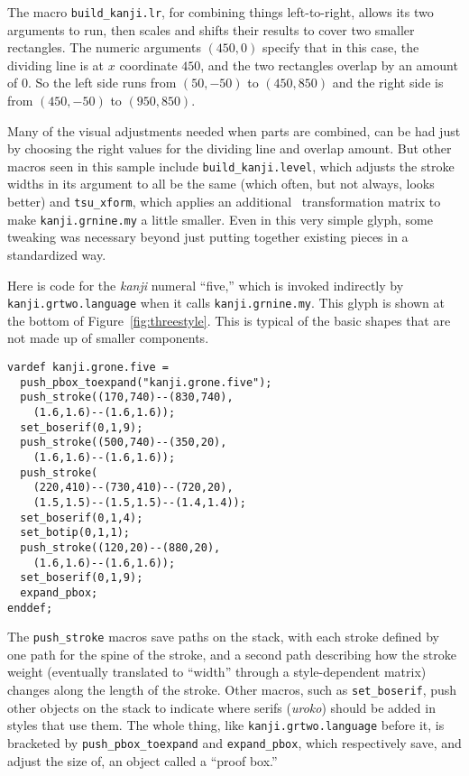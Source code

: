 \documentclass{ltugboat}
\begin{document}
The macro
\verb|build_kanji.lr|, for combining things left-to-right, allows its two
arguments to run, then scales and shifts their results to cover two smaller
rectangles.  The numeric arguments $(450,0)$ specify that in this case, the
dividing line is at $x$ coordinate $450$, and the two rectangles overlap by
an amount of $0$.  So the left side runs from $(50,-50)$ to $(450,850)$ and
the right side is from $(450,-50)$ to $(950,850)$.

Many of the visual adjustments needed when parts are combined, can be had
just by choosing the right values for the dividing line and overlap amount. 
But other macros seen in this sample include \verb|build_kanji.level|, which
adjusts the stroke widths in its argument to all be the same (which often,
but not always, looks better) and \verb|tsu_xform|, which applies an additional
\MF\ transformation matrix to make \verb|kanji.grnine.my| a little smaller.  Even
in this very simple glyph, some tweaking was necessary beyond just
putting together existing pieces in a standardized way.

Here is code for the \emph{kanji} numeral ``five,'' which is invoked indirectly by
\verb|kanji.grtwo.language| when it calls \verb|kanji.grnine.my|.  This
glyph is shown at the bottom of Figure~\ref{fig:threestyle}.  This is
typical of the basic shapes that are not made up of smaller components.
\begin{verbatim}
vardef kanji.grone.five =
  push_pbox_toexpand("kanji.grone.five");
  push_stroke((170,740)--(830,740),
    (1.6,1.6)--(1.6,1.6));
  set_boserif(0,1,9);
  push_stroke((500,740)--(350,20),
    (1.6,1.6)--(1.6,1.6));
  push_stroke(
    (220,410)--(730,410)--(720,20),
    (1.5,1.5)--(1.5,1.5)--(1.4,1.4));
  set_boserif(0,1,4);
  set_botip(0,1,1);
  push_stroke((120,20)--(880,20),
    (1.6,1.6)--(1.6,1.6));
  set_boserif(0,1,9);
  expand_pbox;
enddef;
\end{verbatim}

The \verb|push_stroke| macros save paths on the stack, with each stroke
defined by one path for the spine of the stroke, and a second path
describing how the stroke weight (eventually translated to ``width'' through
a style-dependent matrix) changes along the length of the stroke.  Other
macros, such as \verb|set_boserif|, push other objects on the stack to indicate
where serifs (\emph{uroko}) should be added in styles that use them.  The
whole thing, like \verb|kanji.grtwo.language| before it, is bracketed by
\verb|push_pbox_toexpand| and \verb|expand_pbox|, which respectively save, and adjust
the size of, an object called a ``proof box.''
\end{document}
